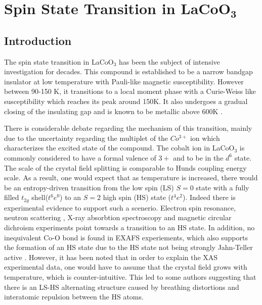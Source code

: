 \documentclass[10pt]{ruthesis}
\begin{document}
{\pagebreak
\chapter{Spin State Transition in $\mathbf{LaCoO_3}$}

\section{Introduction}
The spin state transition in LaCoO$_3$ has been the subject of  intensive investigation for decades.\cite{Heikes, Naiman, Goodenough} This compound is established to be a narrow bandgap insulator at low temperature with Pauli-like magnetic susceptibility. However between 90-150 K, it transitions to a local moment phase with a Curie-Weiss like susceptibility which reaches its peak around 150K. It also undergoes a gradual closing of the insulating gap and is known to be metallic above 600K \cite{BhideMoss, English, Saitoh}.

There is considerable debate regarding the mechanism of this transition, mainly due to the uncertainty regarding the multiplet of the $Co^{3+}$ ion which  characterizes the excited state of the compound.  The cobalt ion in LaCoO$_3$ is commonly considered to have a formal valence of $3+$ and to be in the $d^6$ state. The scale of the crystal field splitting is comparable to Hunds coupling energy scale. As a result, one would expect that as temperature is increased, there would be an entropy-driven transition from the low spin (LS) $S=0$ state with a fully filled $t_{2g}$ shell($t^6e^0$) to an $S=2$ high spin (HS) state ($t^4e^2$)\cite{Goodenough}. Indeed there is experimental evidence to support such a scenerio. Electron spin resonance\cite{Zopka}, neutron scattering \cite{Podlesnyak}, X-ray absorbtion spectroscopy and magnetic circular dichroism experiments\cite{Haverfort} point towards a transition to an HS state. In addition, no inequivalent Co-O bond is found in EXAFS experiements, which also supports the formation of an HS state due to the HS state not being strongly Jahn-Teller active \cite{Sundaram}. However, it has been noted that in order to explain the  XAS experimental data, one would have to assume that the crystal field grows with temperature, which is counter-intuitive.\cite{Eder, Haverfort} This led to some authors suggesting that there is an LS-HS alternating structure caused by breathing distortions\cite{Bari} \cite{Goodenough} and interatomic repulsion between the HS atoms.\cite{Asaka, Eder} 
 
}
\end{document}
